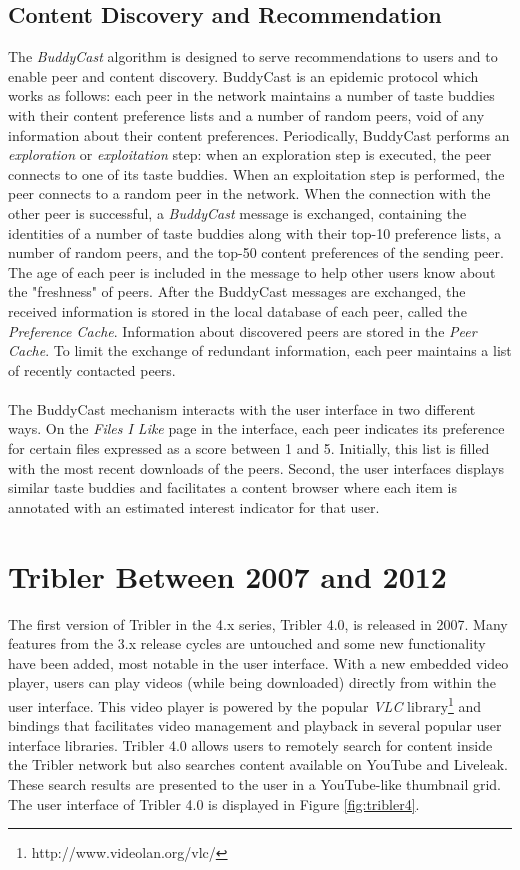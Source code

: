 \subsection{Content Discovery and Recommendation}
The \emph{BuddyCast} algorithm is designed to serve recommendations to users and to enable peer and content discovery. BuddyCast is an epidemic protocol which works as follows: each peer in the network maintains a number of taste buddies with their content preference lists and a number of random peers, void of any information about their content preferences. Periodically, BuddyCast performs an \emph{exploration} or \emph{exploitation} step: when an exploration step is executed, the peer connects to one of its taste buddies. When an exploitation step is performed, the peer connects to a random peer in the network. When the connection with the other peer is successful, a \emph{BuddyCast} message is exchanged, containing the identities of a number of taste buddies along with their top-10 preference lists, a number of random peers, and the top-50 content preferences of the sending peer. The age of each peer is included in the message to help other users know about the "freshness" of peers. After the BuddyCast messages are exchanged, the received information is stored in the local database of each peer, called the \emph{Preference Cache}. Information about discovered peers are stored in the \emph{Peer Cache}. To limit the exchange of redundant information, each peer maintains a list of recently contacted peers.\\\\
The BuddyCast mechanism interacts with the user interface in two different ways. On the \emph{Files I Like} page in the interface, each peer indicates its preference for certain files expressed as a score between 1 and 5. Initially, this list is filled with the most recent downloads of the peers. Second, the user interfaces displays similar taste buddies and facilitates a content browser where each item is annotated with an estimated interest indicator for that user.

\section{Tribler Between 2007 and 2012}
The first version of Tribler in the 4.x series, Tribler 4.0, is released in 2007\cite{tribler4tf}. Many features from the 3.x release cycles are untouched and some new functionality have been added, most notable in the user interface. With a new embedded video player, users can play videos (while being downloaded) directly from within the user interface. This video player is powered by the popular \emph{VLC} library\footnote{http://www.videolan.org/vlc/} and bindings that facilitates video management and playback in several popular user interface libraries. Tribler 4.0 allows users to remotely search for content inside the Tribler network but also searches content available on YouTube and Liveleak. These search results are presented to the user in a YouTube-like thumbnail grid. The user interface of Tribler 4.0 is displayed in Figure \ref{fig:tribler4}.\\

